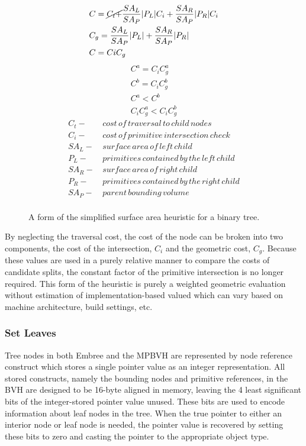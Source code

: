 \begin{figure}[H]
  \begin{align}
&C =  \cancel{C_{t} +} \frac{SA_{L}}{SA_{P}} |P_{L}|C_{i} + \frac{SA_{R}}{SA_{P}} |P_{R}|C_{i} \\
&C_{g} = \frac{SA_{L}}{SA_{P}} |P_{L}| +  \frac{SA_{R}}{SA_{P}}|P_{R}| \\
&C = C{i}C_{g}
  \end{align}
  \begin{align*}
    C^{a} = C_{i} C^{a}_{g} \\
    C^{b} = C_{i} C^{b}_{g} \\
    C^{a} < C^{b} \\
    C_{i}C^{a}_{g} < C_{i}C^{b}_{g}
  \end{align*}
  \begin{align*}
    C_{t} - & \,cost\, of\, traversal\, to\, child\, nodes \\
    C_{i} - & \, cost\, of\, primitive\, intersection\, check\, \\
    SA_{L} - &  \,surface\, area\, of\, left\, child \\
    P_{L} - & \, primitives\, contained\, by\, the\, left\, child  \\
    SA_{R} - & \, surface\, area\, of\, right\, child \\
    P_{R} - & \, primitives\, contained\, by\, the\, right\, child \\
    SA_{P} - & \, parent\, bounding\, volume \\
  \end{align*}
  \caption{A form of the simplified surface area heuristic for a binary tree.}
  \label{fig:SSAH}
\end{figure}

By neglecting the traversal cost, the cost of the node can be broken into two
components, the cost of the intersection, $C_{i}$ and the geometric cost,
$C_{g}$. Because these values are used in a purely relative manner to compare
the costs of candidate splits, the constant factor of the primitive intersection
is no longer required. This form of the heuristic is purely a weighted geometric
evaluation without estimation of implementation-based valued which can vary
based on machine architecture, build settings, etc.

\subsubsection{Set Leaves}

Tree nodes in both Embree and the MPBVH are represented by node
reference construct which stores a single pointer value as an integer
representation. All stored constructs, namely the bounding nodes and primitive
references, in the BVH are designed to be 16-byte aligned in memory, leaving the
4 least significant bits of the integer-stored pointer value unused. These bits
are used to encode information about leaf nodes in the tree. When the true
pointer to either an interior node or leaf node is needed, the pointer value is
recovered by setting these bits to zero and casting the pointer to the
appropriate object type.

